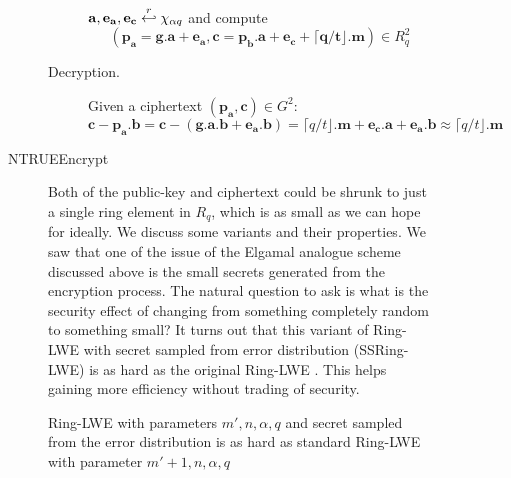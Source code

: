 \begin{description}
\begin{description}
\begin{description}
\begin{description}
                            $\mathbf{a,e_a,e_c} \stackrel{r}{\hookleftarrow} \chi_{\alpha q}$
                            and compute $$(\mathbf{p_a = g.a + e_a}, \mathbf{c =
                            p_b.a + e_c + \lceil q/t \rfloor . m}) \in
                            R_q^2$$
                        \item [Decryption.] Given a ciphertext
                            $(\mathbf{p_a,c}) \in G^2$:
                            \[
                                \mathbf{c - p_a.b = c - (g.a.b + e_a.b)} =
                                \lceil q/t \rfloor .\mathbf{m} + \mathbf{e_c.a}
                                + \mathbf{e_a.b} \approx \lceil q/t
                                \rfloor.\mathbf{m}
                            \]
                    \end{description}

                \item[NTRUEEncrypt \cite{hoffstein1998ntru}] Both of the public-key and ciphertext
                    could be shrunk to just a single ring element in
                    $R_q$, which is as small as we can hope for
                    ideally. We discuss some variants and their
                    properties. We saw that one of the issue of the
                    Elgamal analogue scheme discussed above is the
                    small secrets generated from the encryption
                    process. The natural question to ask is what is
                    the security effect of changing from something
                    completely random to something small? It turns out
                    that this variant of Ring-LWE with secret sampled
                    from error distribution (SSRing-LWE) is as hard as
                    the original Ring-LWE
                    \cite{lyubashevsky2008lattice}. This helps gaining
                    more efficiency without trading of security.

                    \begin{lemma}
                      \label{lem:SSRing-LWE}
                      Ring-LWE with parameters \(m', n, \alpha, q\) and secret sampled from the error distribution is as
                      hard as standard Ring-LWE with parameter \(m' + 1, n, \alpha, q\)
                    \end{lemma}


\end{description}
\end{description}
\end{description}
